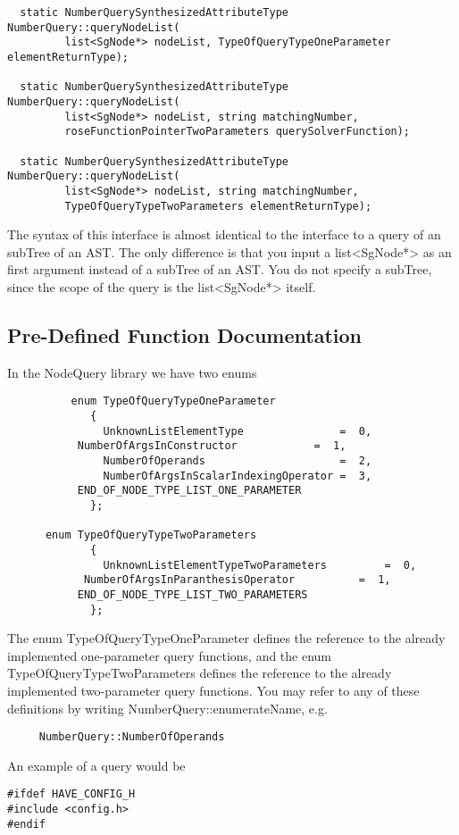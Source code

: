 {\begin{verbatim}
  static NumberQuerySynthesizedAttributeType NumberQuery::queryNodeList(
         list<SgNode*> nodeList, TypeOfQueryTypeOneParameter elementReturnType);
	  
  static NumberQuerySynthesizedAttributeType NumberQuery::queryNodeList(
         list<SgNode*> nodeList, string matchingNumber, 
         roseFunctionPointerTwoParameters querySolverFunction);  

  static NumberQuerySynthesizedAttributeType NumberQuery::queryNodeList(
         list<SgNode*> nodeList, string matchingNumber, 
         TypeOfQueryTypeTwoParameters elementReturnType);
\end{verbatim}
The syntax of this interface is almost identical to the interface to a query
of an subTree of an AST.  The only difference is that you input a
list<SgNode*> as an first argument instead of a subTree of an AST. You
do not specify a subTree, since the scope of the query is the list<SgNode*> itself.  


\subsection{Pre-Defined Function Documentation}
\label{FunctionDocumentation}

In the NodeQuery library we have two enums
\begin{verbatim}
          enum TypeOfQueryTypeOneParameter
             {
               UnknownListElementType               =  0,
	       NumberOfArgsInConstructor            =  1,
               NumberOfOperands                     =  2,
               NumberOfArgsInScalarIndexingOperator =  3,
	       END_OF_NODE_TYPE_LIST_ONE_PARAMETER
             };
	 
	  enum TypeOfQueryTypeTwoParameters
             {
               UnknownListElementTypeTwoParameters         =  0,
	        NumberOfArgsInParanthesisOperator          =  1,
	       END_OF_NODE_TYPE_LIST_TWO_PARAMETERS
             };
\end{verbatim}
The enum TypeOfQueryTypeOneParameter defines the reference to the
already implemented one-parameter query functions, and the enum 
TypeOfQueryTypeTwoParameters defines the reference to the already
implemented two-parameter query functions. You may refer to any of
these definitions by writing NumberQuery::enumerateName, e.g.
\begin{verbatim}
     NumberQuery::NumberOfOperands
\end{verbatim}
An example of a query would be 
\begin{verbatim}
#ifdef HAVE_CONFIG_H
#include <config.h>
#endif


\end{verbatim}}
